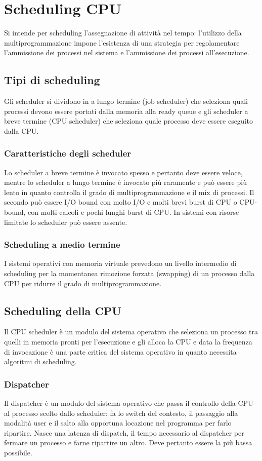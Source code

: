 \chapter{Scheduling CPU}
Si intende per scheduling l'assegnazione di attivit\`a nel tempo: l'utilizzo della multiprogrammazione impone l'esistenza di una strategia per regolamentare l'ammissione dei processi
nel sistema e l'ammissione dei processi all'esecuzione. 
\section{Tipi di scheduling}
Gli scheduler si dividono in a lungo termine (job scheduler) che seleziona quali processi devono essere portati dalla memoria alla ready queue e gli scheduler a breve termine (CPU 
scheduler) che seleziona quale processo deve essere eseguito dalla CPU.
\subsection{Caratteristiche degli scheduler}
Lo scheduler a breve termine \`e invocato spesso e pertanto deve essere veloce, mentre lo scheduler a lungo termine \`e invocato pi\`u raramente e pu\`o essere pi\`u lento in quanto
controlla il grado di multiprogrammazione e il mix di processi. Il secondo pu\`o essere I/O bound con molto I/O e molti brevi burst di CPU o CPU-bound, con molti calcoli e pochi lunghi
burst di CPU. In sistemi con risorse limitate lo scheduler pu\`o essere assente. 
\subsection{Scheduling a medio termine}
I sistemi operativi con memoria virtuale prevedono un livello intermedio di scheduling per la momentanea rimozione forzata (swapping) di un processo dalla CPU per ridurre il grado di 
multiprogrammazione.
\section{Scheduling della CPU}
Il CPU scheduler \`e un modulo del sistema operativo che seleziona un processo tra quelli in memoria pronti per l'esecuzione e gli alloca la CPU e data la frequenza di invocazione \`e
una parte critica del sistema operativo in quanto necessita algoritmi di scheduling.
\subsection{Dispatcher}
Il dispatcher \`e un modulo del sistema operativo che passa il controllo della CPU al processo scelto dallo scheduler: fa lo switch del contesto, il passaggio alla modalit\`a user e 
il salto alla opportuna locazione nel programma per farlo ripartire. Nasce una latenza di dispatch, il tempo necessario al dispatcher per fermare un processo e farne ripartire un altro.
Deve pertanto essere la pi\`u bassa possibile. 
